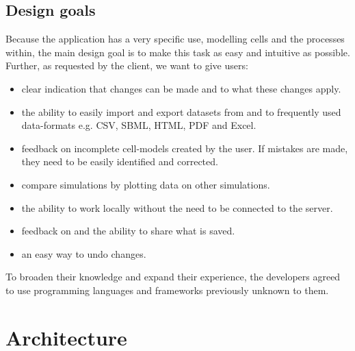 \documentclass{report}
\begin{document}
		\subsection{Design goals}
			Because the application has a very specific use, modelling cells and the processes within, the main design goal is to make this task as easy and intuitive as possible.
			Further, as requested by the client, we want to give users:
			\begin{itemize}
				\item clear indication that changes can be made and to what these changes apply.
				\item the ability to easily import and export datasets from and to frequently used data-formats e.g. CSV, SBML, HTML, PDF and Excel.
				\item feedback on incomplete cell-models created by the user. If mistakes are made, they need to be easily identified and corrected.
				\item compare simulations by plotting data on other simulations.
				\item the ability to work locally without the need to be connected to the server.
				\item feedback on and the ability to share what is saved.
				\item an easy way to undo changes.
			\end{itemize}
			To broaden their knowledge and expand their experience, the developers agreed to use programming languages and frameworks previously unknown to them.
	\clearpage
	\section{Architecture}
			
\end{document}
